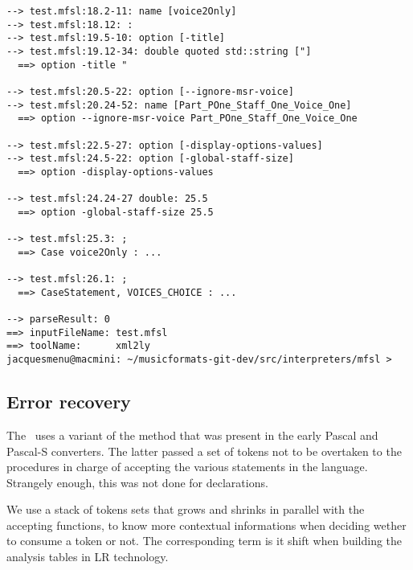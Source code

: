 \begin{lstlisting}[language=Terminal]
--> test.mfsl:18.2-11: name [voice2Only]
--> test.mfsl:18.12: :
--> test.mfsl:19.5-10: option [-title]
--> test.mfsl:19.12-34: double quoted std::string ["]
  ==> option -title "

--> test.mfsl:20.5-22: option [--ignore-msr-voice]
--> test.mfsl:20.24-52: name [Part_POne_Staff_One_Voice_One]
  ==> option --ignore-msr-voice Part_POne_Staff_One_Voice_One

--> test.mfsl:22.5-27: option [-display-options-values]
--> test.mfsl:24.5-22: option [-global-staff-size]
  ==> option -display-options-values

--> test.mfsl:24.24-27 double: 25.5
  ==> option -global-staff-size 25.5

--> test.mfsl:25.3: ;
  ==> Case voice2Only : ...

--> test.mfsl:26.1: ;
  ==> CaseStatement, VOICES_CHOICE : ...

--> parseResult: 0
==> inputFileName: test.mfsl
==> toolName:      xml2ly
jacquesmenu@macmini: ~/musicformats-git-dev/src/interpreters/mfsl >
\end{lstlisting}


\subsection{Error recovery}

The \mfslInterp\ uses a variant of the  method that was present in the early Pascal and Pascal-S converters. The latter passed a set of tokens not to be overtaken to the procedures in charge of accepting the various statements in the language. Strangely enough, this was not done for declarations.

We use a stack of tokens sets that grows and shrinks in parallel with the accepting functions, to know more contextual informations when deciding wether to consume a token or not. The corresponding term is {it shift}
when building the analysis tables in LR technology.


